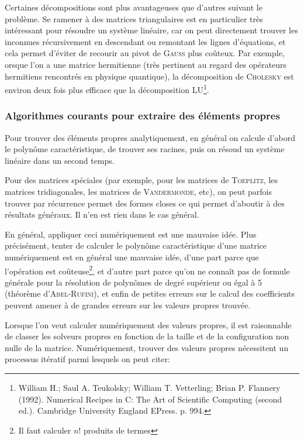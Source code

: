 \documentclass[svgnames,dvipsnames,a4paper,10pt,french]{report}
\begin{document}
Certaines décompositions sont plus avantageuses que d'autres suivant le problème. Se ramener à des matrices triangulaires est en particulier très intéressant pour résoudre un système linéaire, car on peut directement trouver les inconnues récursivement en descendant ou remontant les lignes d'équations, et cela permet d'éviter de recourir au pivot de \textsc{Gauss} plus coûteux. 
Par exemple, orsque l'on a une matrice  hermitienne (très pertinent au regard des opérateurs hermitiens rencontrés en physique quantique), la décomposition de \textsc{Cholesky} est environ deux fois plus efficace que la décomposition LU\footnote{William H.; Saul A. Teukolsky; William T. Vetterling; Brian P. Flannery (1992). Numerical Recipes in C: The Art of Scientific Computing (second ed.). Cambridge University England EPress. p. 994.}.

\subsubsection{Algorithmes courants pour extraire des éléments propres}
Pour trouver des éléments propres analytiquement, en général on calcule d'abord le polynôme caractéristique, de trouver ses racines, puis on résoud un système linéaire dans un second temps.

Pour des matrices spéciales (par exemple, pour les matrices de \textsc{Toeplitz}, les matrices tridiagonales, les matrices de \textsc{Vandermonde}, etc), on peut parfois trouver par récurrence permet des formes closes ce qui permet d'aboutir à des résultats généraux. Il n'en est rien dans le cas général.



En général, appliquer ceci numériquement est une mauvaise idée. Plus précisément, tenter de calculer le polynôme caractéristique d'une matrice numériquement est en général une mauvaise idée, d'une part parce que l'opération est coûteuse\footnote{Il faut calculer $n!$ produits de termes}, et d'autre part parce qu'on ne connaît pas de formule générale pour la résolution de polynômes de degré supérieur ou égal à 5 (théorème d'\textsc{Abel-Rufini}), et enfin de petites erreurs sur le calcul des coefficients peuvent amener à de grandes erreurs sur les valeurs propres trouvée.




Lorsque l'on veut calculer numériquement des valeurs propres, il est raisonnable de classer les solveurs propres en fonction de la taille et de la configuration non nulle de la matrice. Numériquement, trouver des valeurs propres nécessitent un processus itératif parmi lesquels on peut citer:
\end{document}
